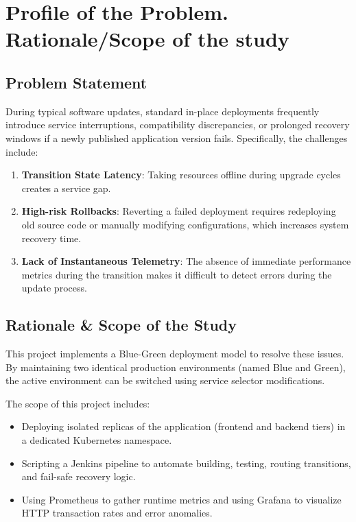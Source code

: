 \documentclass[12pt,a4paper]{article}
\begin{document}
\section{Profile of the Problem. Rationale/Scope of the study}
\subsection{Problem Statement}
During typical software updates, standard in-place deployments frequently introduce service interruptions, compatibility discrepancies, or prolonged recovery windows if a newly published application version fails. Specifically, the challenges include:
\begin{enumerate}
    \item \textbf{Transition State Latency}: Taking resources offline during upgrade cycles creates a service gap.
    \item \textbf{High-risk Rollbacks}: Reverting a failed deployment requires redeploying old source code or manually modifying configurations, which increases system recovery time.
    \item \textbf{Lack of Instantaneous Telemetry}: The absence of immediate performance metrics during the transition makes it difficult to detect errors during the update process.
\end{enumerate}

\subsection{Rationale \& Scope of the Study}
This project implements a Blue-Green deployment model to resolve these issues. By maintaining two identical production environments (named Blue and Green), the active environment can be switched using service selector modifications. 

The scope of this project includes:
\begin{itemize}
    \item Deploying isolated replicas of the application (frontend and backend tiers) in a dedicated Kubernetes namespace.
    \item Scripting a Jenkins pipeline to automate building, testing, routing transitions, and fail-safe recovery logic.
    \item Using Prometheus to gather runtime metrics and using Grafana to visualize HTTP transaction rates and error anomalies.
\end{itemize}
\end{document}
